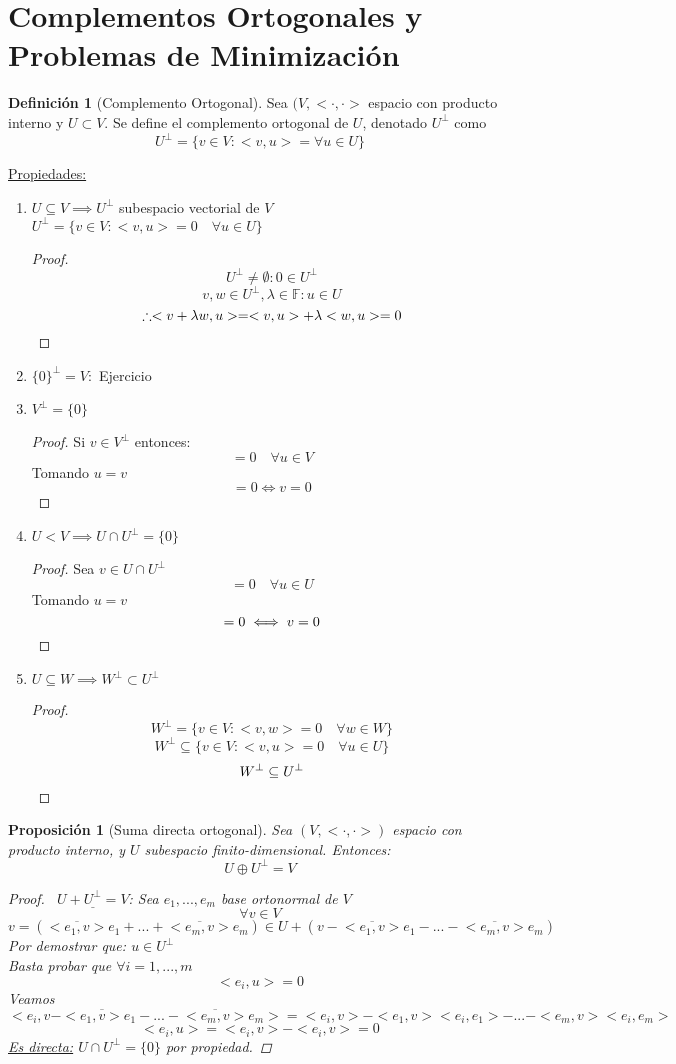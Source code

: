 \documentclass[11pt]{book}
\newcommand{\set}[1]{\mathbb{#1}}
\newtheorem{prop}[thm]{Proposición}
\theoremstyle{definition}
\newtheorem{defn}{Definición}[section]
\begin{document}
\section{Complementos Ortogonales y Problemas de Minimización}
\begin{defn}[Complemento Ortogonal]
	Sea $(V,<\cdot,\cdot>$ espacio con producto interno y $U\subset V$. Se define el complemento ortogonal de $U$, denotado $U^\perp$ como
	\[U^\perp=\{v\in V:<v,u>=\forall u\in U\}\]
\end{defn}
\underline{Propiedades:}
\begin{enumerate}[label=\textbf{(\alph*)}]
	\item $U\subseteq V\implies U^\perp$ subespacio vectorial de $V$\\
	$U^\perp=\{v\in V:<v,u>=0\quad\forall u\in U\}$
	\begin{proof}
		\[U^\perp\neq\emptyset:0\in U^\perp\]
		\[v,w\in U^\perp,\lambda\in\set{F}: u\in U\]
		\[\therefore<v+\lambda w,u>=<v,u>+\lambda<w,u>=0\qedhere\]
	\end{proof}

	\item $\{0\}^\perp=V:$ Ejercicio

	\item $V^\perp=\{0\}$
	\begin{proof}
		Si $v\in V^\perp$ entonces:
		\[<v,u>=0\quad\forall u\in V\]
		Tomando $u=v$
		\[<v,v>=0\iff v=0\]
	\end{proof}

	\item $U<V\implies U\cap U^\perp=\{0\}$
	\begin{proof}
		Sea $v\in U\cap U^\perp$
		\[<v,u>=0\quad\forall u\in U\]
		Tomando $u=v$
		\[<v,v>=0\iff v=0\qedhere\]
	\end{proof}

	\item $U\subseteq W\implies W^\perp\subset U^\perp$
	\begin{proof}
		\[W^\perp=\{v\in V:<v,w>=0\quad\forall w\in W\}\]
		\[W^\perp\subseteq\{v\in V:<v,u>=0\quad\forall u\in U\}\]
		\[W^\perp\subseteq U^\perp\qedhere\]
	\end{proof}
\end{enumerate}
\begin{prop}[Suma directa ortogonal]
	Sea $(V,<\cdot,\cdot>)$ espacio con producto interno, y $U$ subespacio finito-dimensional. Entonces:
	\[U\oplus U^\perp=V\]
	\begin{proof}
		\
		$\underline{U+U^\perp=V}$: Sea $e_1,...,e_m$ base ortonormal de $V$
		\[\forall v\in V\]
		\[v=(\overline{<e_1,v>}e_1+...+\overline{<e_m,v>}e_m)\in U+(v-\overline{<e_1,v>}e_1-...-\overline{<e_m,v>}e_m)\]
		Por demostrar que: $u\in U^\perp$\\
		Basta probar que $\forall i=1,...,m$
		\[<e_i,u>=0\]
		Veamos
		\[<e_i,v-<\overline{e_1,v>}e_1-...-\overline{<e_m,v>}e_m>=<e_i,v>-<e_1,v><e_i,e_1>-...-<e_m,v><e_i,e_m>\]
		\[<e_i,u>=<e_i,v>-<e_i,v>=0\]
		\underline{Es directa:} $U\cap U^\perp=\{0\}$ por propiedad.
	\end{proof}
\end{prop}
\end{document}

